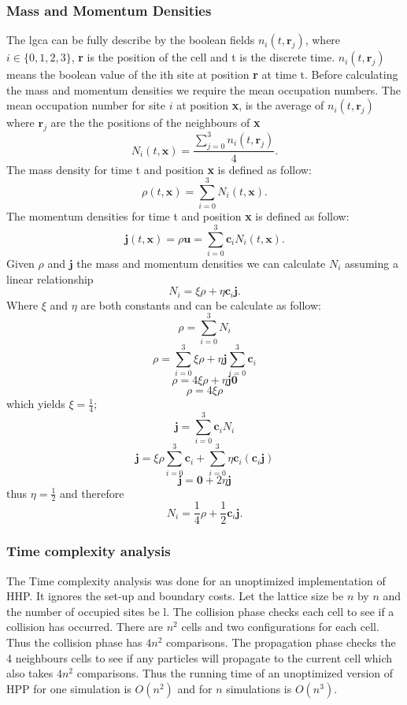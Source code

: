 \documentclass[a4paper,10pt]{article}
\begin{document}
\subsubsection{Mass and Momentum Densities}
The \acrshort{lgca} can be fully describe by the boolean fields $n_{i}(t, \textbf{r}_{j})$, where $i \in \{0, 1, 2, 3\}$, \textbf{r} is the position of the cell and t is the discrete time. $n_{i}(t, \textbf{r}_{j})$ means the boolean value of the ith site at position \textbf{r} at time t.
Before calculating the mass and momentum densities we require the mean occupation numbers. The mean occupation number for site $i$ at position \textbf{x}, is the average of $n_{i}(t, \textbf{r}_{j})$ where 
$\textbf{r}_{j}$ are the the positions of the neighbours of \textbf{x}
\[N_{i}(t,\textbf{x}) = \frac{\sum_{j = 0}^{3} n_{i}(t,\textbf{r}_{j})}{4}.\]
The mass density for time t and position \textbf{x} is defined as follow:
\[\rho(t, \textbf{x}) = \sum_{i = 0}^{3} N_{i}(t, \textbf{x}).\]
The momentum densities for time t and position \textbf{x} is defined as follow:
\[\boldsymbol{j}(t, \textbf{x}) = \rho\boldsymbol{u} = \sum_{i = 0}^{3} \textbf{c}_{i}N_{i}(t, \textbf{x}).\]
Given $\rho$ and $\boldsymbol{j}$ the mass and momentum densities we can calculate $N_{i}$ assuming
a linear relationship
\[N_{i} = \xi\rho + \eta\textbf{c}_{i}\boldsymbol{j}.\]
Where $\xi$ and $\eta$ are both constants and can be calculate as follow:
\[\rho = \sum_{i = 0}^{3} N_{i}
\]
\[\rho = \sum_{i = 0}^{3} \xi\rho  + \eta\boldsymbol{j}\sum_{i = 0}^{3} \textbf{c}_{i}
\]
\[\rho = 4\xi\rho  + \eta\boldsymbol{j}\boldsymbol{0} 
\]
\[\rho = 4\xi\rho
\]
which yields $\xi = \frac{1}{4};$
\[\boldsymbol{j} = \sum_{i = 0}^{3} \textbf{c}_{i}N_{i}\]
\[\boldsymbol{j} = \xi\rho\sum_{i = 0}^{3} \textbf{c}_{i} + \sum_{i = 0}^{3} \eta\textbf{c}_{i}(\textbf{c}_{i}\boldsymbol{j})\]
\[\boldsymbol{j} = \boldsymbol{0} + 2\eta\boldsymbol{j}\]
thus $\eta = \frac{1}{2}$ and therefore
	\[N_{i} =\frac{1}{4}\rho + \frac{1}{2}\textbf{c}_{i}\boldsymbol{j}.\]
\subsubsection{Time complexity analysis}
The Time complexity analysis was done for an unoptimized implementation of HHP. It ignores the set-up and boundary costs. Let the lattice size be $n$ by $n$ and the number of occupied sites be l. The collision phase checks each cell to see if a collision has occurred. There are $n^2$ cells and two configurations for each cell. Thus the collision phase has $4n^2$ comparisons.
 The propagation phase checks the 4 neighbours cells to see if any particles will propagate to the current cell which also takes $4n^2$ comparisons. Thus the running time of an unoptimized version of HPP for one simulation is
 $O(n^2)$ and for $n$ simulations is $O(n^3)$.
\end{document}
